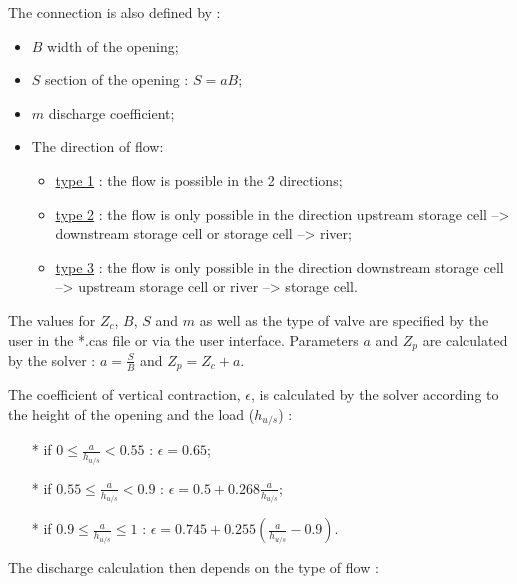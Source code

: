 The connection is also defined by :
\begin{itemize}
 \item $B$ width of the opening;
 \item $S$ section of the opening : $S = a B$;
 \item $m$ discharge coefficient;
 \item The direction of flow:
   \begin{itemize}
     \item \underline{type 1} : the flow is possible in the 2 directions;
     \item \underline{type 2} : the flow is only possible in the direction upstream storage cell --> downstream storage cell or storage cell --> river;
     \item \underline{type 3} : the flow is only possible in the direction downstream storage cell --> upstream storage cell or river --> storage cell.
   \end{itemize}
\end{itemize}

\vspace{0.5cm}

The values for $Z_c$, $B$, $S$ and $m$ as well as the type of valve are specified by the user in the *.cas file or via the user interface. Parameters $a$ and $Z_p$ are calculated by the solver : $a = \frac{S}{B}$ and $Z_p = Z_c + a$.

\vspace{0.5cm}

The coefficient of vertical contraction, $\epsilon$, is calculated by the solver according to the height of the opening and the load ($h_{u/s}$) :

\begin{itemize}
 \item[*] if $0 \leq \frac{a}{h_{u/s}} < 0.55$ : $\epsilon = 0.65$;
 \item[*] if $0.55 \leq \frac{a}{h_{u/s}} < 0.9$ : $\epsilon = 0.5 + 0.268 \frac{a}{h_{u/s}}$;
 \item[*] if $0.9 \leq \frac{a}{h_{u/s}} \leq 1$ : $\epsilon = 0.745 + 0.255 \left ( \frac{a}{h_{u/s}} -0.9 \right )$.
\end{itemize}

\vspace{0.5cm}

The discharge calculation then depends on the type of flow :


